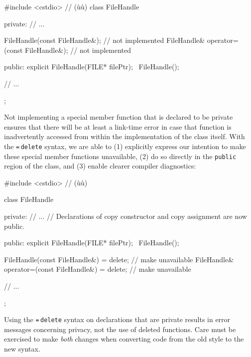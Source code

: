 \begin{emcppslisting}
#include <cstdio>  // (ù{}ù)
class FileHandle
{
private:
    // ...

    FileHandle(const FileHandle&);             // not implemented
    FileHandle& operator=(const FileHandle&);  // not implemented

public:
    explicit FileHandle(FILE* filePtr);
    ~FileHandle();

    // ...
};
\end{emcppslisting}

\noindent Not implementing a special member function that is declared to be private ensures that there will be at least a link-time error in case that function is inadvertently accessed from within the implementation of the class itself. With the \lstinline!=!\,\lstinline!delete! syntax, we are able to (1)
explicitly express our intention to make these special member
functions unavailable, (2) do so directly in the \lstinline!public! region
of the class, and (3) enable clearer compiler diagnostics:

%
%
%
\begin{emcppshiddenlisting}[emcppsbatch=e1]
#include <cstdio>  // (ù{}ù)
\end{emcppshiddenlisting}
\begin{emcppslisting}[emcppsbatch=e1]
class FileHandle
{
private:
    // ...
    // Declarations of copy constructor and copy assignment are now public.

public:
    explicit FileHandle(FILE* filePtr);
    ~FileHandle();

    FileHandle(const FileHandle&) = delete;             // make unavailable
    FileHandle& operator=(const FileHandle&) = delete;  // make unavailable

    // ...
};
\end{emcppslisting}
\newpage%

\noindent Using the \lstinline!=!\,\lstinline!delete! syntax on declarations that are private results in error messages concerning privacy, not the use of deleted functions. Care must be exercised to make \emph{both} changes when converting code from the old style to the new syntax.

